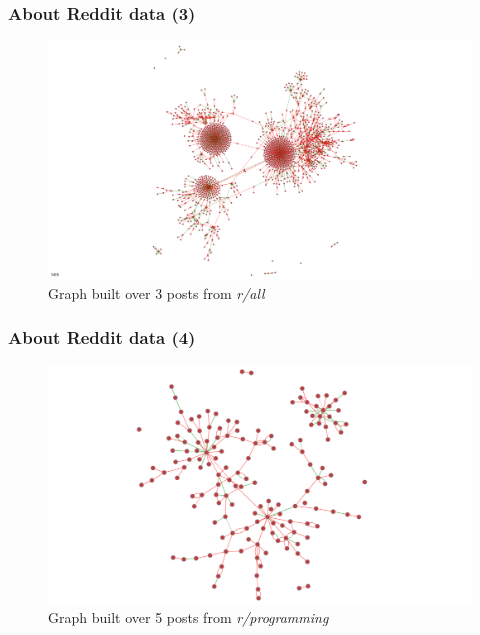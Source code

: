 \documentclass{beamer}
\begin{document}
\begin{frame}[c]
    \frametitle{About Reddit data (3)}

    \begin{figure}[h]
        \centering
        \includegraphics[width=\linewidth]{img/reddit_all_3.png}
        \caption{Graph built over 3 posts from \textit{r/all}}%
        \label{fig:img/reddit_politics_graph}
    \end{figure}
\end{frame}

\begin{frame}[c]
    \frametitle{About Reddit data (4)}

    \begin{figure}[h]
        \centering
        \includegraphics[width=\linewidth]{img/reddit_programming_5.png}
        \caption{Graph built over 5 posts from \textit{r/programming}}%
        \label{fig:img/reddit_politics_graph}
    \end{figure}
\end{frame}
\end{document}
